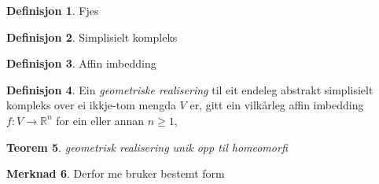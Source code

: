 \documentclass[a4paper, titlepage, 12pt, norsk]{article}
\theoremstyle{plain}
\newtheorem{theorem}{Teorem}[section]
\theoremstyle{definition}
\newtheorem{definition}[theorem]{Definisjon}
\newtheorem{remark}[theorem]{Merknad}
\newcommand{\R}{\mathbb{R}}
\begin{document}
\begin{definition}
	Fjes
\end{definition}
\begin{definition}
	Simplisielt kompleks
\end{definition}
\begin{definition}
	Affin imbedding
\end{definition}
\begin{definition}
	Ein \emph{geometriske realisering} til eit endeleg abstrakt simplisielt kompleks over ei ikkje-tom mengda $V$ er, gitt ein vilkårleg affin imbedding $f:V\to\R^n$ for ein eller annan $n\geq1$, 
\end{definition}
\begin{theorem}
	geometrisk realisering unik opp til homeomorfi
\end{theorem}
\begin{remark}
	Derfor me bruker bestemt form
\end{remark}
\end{document}
